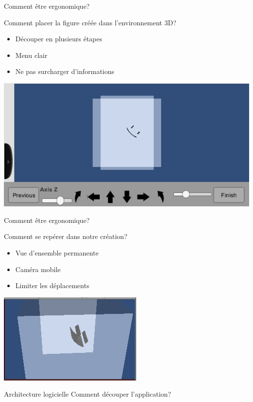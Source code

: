 \documentclass[a4paper,10pt]{beamer}
\begin{document}
		\begin{frame}{Comment être ergonomique?}
						
				Comment placer la figure créée dans l'environnement 3D?
				
				\begin{itemize}
					\item Découper en plusieurs étapes
					\item Menu clair
					\item Ne pas surcharger d'informations
				\end{itemize}
				
				\centerline{\includegraphics[scale=0.5]{images/Nono/img4.png}} 
						
						
						
		\end{frame}	
		
		\begin{frame}{Comment être ergonomique?}
			
			Comment se repérer dans notre création?
			
			\begin{itemize}
				\item Vue d'ensemble permanente
				\item Caméra mobile
				\item Limiter les déplacements
			\end{itemize}
			
			\centerline{\includegraphics[scale=0.5]{images/Nono/img5.png}} 
			
			
			
		\end{frame}	
	\begin{frame}{Architecture logicielle} %
		\huge Comment découper l'application?
	\end{frame}
	
\end{document}
